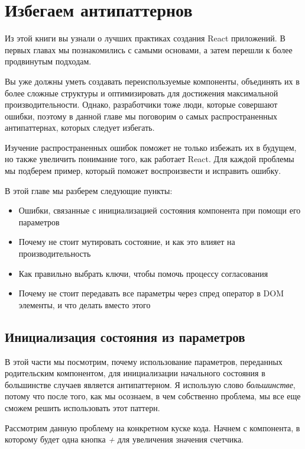 \chapter{Избегаем антипаттернов}

Из этой книги вы узнали о лучших практиках создания React приложений. В первых главах мы познакомились с самыми основами, а затем перешли к более продвинутым подходам.

Вы уже должны уметь создавать переиспользуемые компоненты, объединять их в более сложные структуры и оптимизировать для достижения максимальной производительности. Однако, разработчики тоже люди, которые совершают ошибки, поэтому в данной главе мы поговорим о самых распространенных антипаттернах, которых следует избегать.

Изучение распространенных ошибок поможет не только избежать их в будущем, но также увеличить понимание того, как работает React. Для каждой проблемы мы подберем пример, который поможет воспроизвести и исправить ошибку.

В этой главе мы разберем следующие пункты:

\begin{itemize}
  \item Ошибки, связанные с инициализацией состояния компонента при помощи его параметров
  \item Почему не стоит мутировать состояние, и как это влияет на производительность
  \item Как правильно выбрать ключи, чтобы помочь процессу согласования
  \item Почему не стоит передавать все параметры через спред оператор в DOM элементы, и что делать вместо этого
\end{itemize}


\section{Инициализация состояния из параметров}

В этой части мы посмотрим, почему использование параметров, переданных родительским компонентом, для инициализации начального состояния в большинстве случаев является антипаттерном. Я использую слово \textit{большинстве}, потому что после того, как мы осознаем, в чем собственно проблема, мы все еще сможем решить использовать этот паттерн. 

Рассмотрим данную проблему на конкретном куске кода. Начнем с компонента, в которому будет одна кнопка \textit{+} для увеличения значения счетчика.

